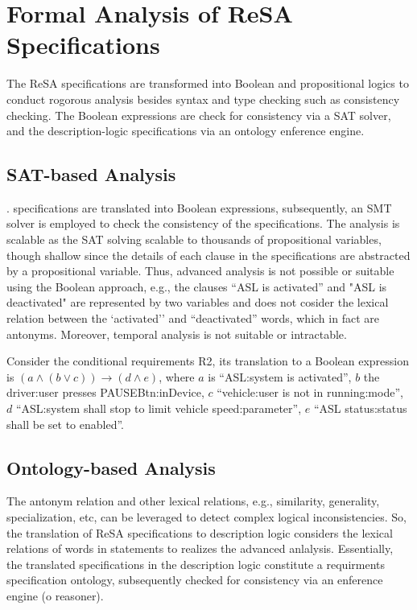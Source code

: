 \section{Formal Analysis of ReSA Specifications}
The ReSA specifications are transformed into Boolean and propositional logics to conduct rogorous analysis besides syntax and type checking such as consistency checking. The Boolean expressions are check for consistency via a SAT solver, and the description-logic specifications via an ontology enference engine. 

\subsection{SAT-based Analysis}.
specifications are translated into Boolean expressions, subsequently, an SMT solver is employed to check the consistency of the specifications. The analysis is scalable as the SAT solving scalable to thousands of propositional variables, though shallow since the details of each clause in the specifications are abstracted by a propositional variable. Thus, advanced analysis is not possible or suitable using the Boolean approach, e.g., the clauses ``ASL is activated'' and "ASL is deactivated" are represented by two variables and does not cosider the lexical relation between the `activated'' and ``deactivated'' words, which in fact are antonyms. Moreover, temporal analysis is not suitable or intractable. 

Consider the conditional requirements R2, its translation to a Boolean expression is  $(a\land(b\lor c))\rightarrow (d\land e)$, where $a$ is ``ASL:system is activated'', $b$ the driver:user presses PAUSEBtn:inDevice, $c$ ``vehicle:user is not in running:mode'', $d$ ``ASL:system shall stop to limit vehicle speed:parameter'', $e$ ``ASL status:status shall be set to enabled''.

\subsection{Ontology-based Analysis}
The antonym relation and other lexical relations, e.g., similarity, generality, specialization, etc, can be leveraged to detect complex logical inconsistencies. So, the translation of ReSA specifications to description logic considers the lexical relations of words in statements to realizes the advanced anlalysis. Essentially, the translated specifications in the description logic constitute a requirments specification ontology, subsequently checked for consistency via an enference engine (o reasoner).

